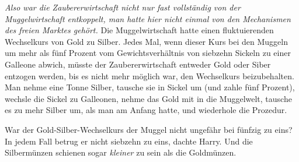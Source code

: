 \emph{Also war die Zaubererwirtschaft nicht nur fast vollständig von der Muggelwirtschaft entkoppelt, man hatte hier nicht einmal von den Mechanismen des freien Marktes gehört.} Die Muggelwirtschaft hatte einen fluktuierenden Wechselkurs von Gold zu Silber. Jedes Mal, wenn dieser Kurs bei den Muggeln um mehr als fünf Prozent vom Gewichtsverhältnis von siebzehn Sickeln zu einer Galleone abwich, müsste der Zaubererwirtschaft entweder Gold oder Siber entzogen werden, bis es nicht mehr möglich war, den Wechselkurs beizubehalten. Man nehme eine Tonne Silber, tausche sie in Sickel um (und zahle fünf Prozent), wechsle die Sickel zu Galleonen, nehme das Gold mit in die Muggelwelt, tausche es zu mehr Silber um, als man am Anfang hatte, und wiederhole die Prozedur.

War der Gold-Silber-Wechselkurs der Muggel nicht ungefähr bei fünfzig zu eins? In jedem Fall betrug er nicht siebzehn zu eins, dachte Harry. Und die Silbermünzen schienen sogar \emph{kleiner} zu sein als die Goldmünzen.

